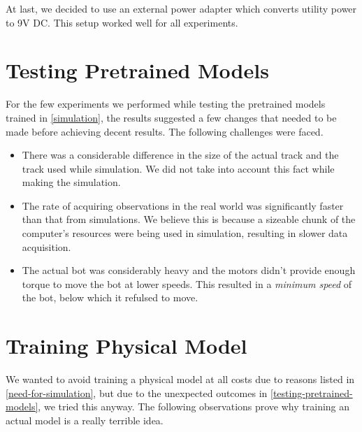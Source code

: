 \documentclass[12pt]{extreport}
\begin{document}
At last, we decided to use an external power adapter which converts utility power to 9V DC. This setup worked well for all experiments.

\section{Testing Pretrained Models} \label{testing-pretrained-models}
For the few experiments we performed while testing the pretrained models trained in \autoref{simulation}, the results suggested a few changes that needed to be made before achieving decent results. The following challenges were faced.

\begin{itemize}
 \item There was a considerable difference in the size of the actual track and the track used while simulation. We did not take into account this fact while making the simulation.
 \item The rate of acquiring observations in the real world was significantly faster than that from simulations. We believe this is because a sizeable chunk of the computer's resources were being used in simulation, resulting in slower data acquisition.
 \item The actual bot was considerably heavy and the motors didn't provide enough torque to move the bot at lower speeds. This resulted in a \emph{minimum speed} of the bot, below which it refulsed to move.
\end{itemize}

\section{Training Physical Model}

We wanted to avoid training a physical model at all costs due to reasons listed in \autoref{need-for-simulation}, but due to the unexpected outcomes in \autoref{testing-pretrained-models}, we tried this anyway. The following observations prove why training an actual model is a really terrible idea.
\end{document}
